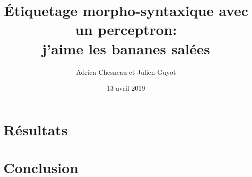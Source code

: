 \documentclass{article}
\title{Étiquetage morpho-syntaxique avec un perceptron: \\
  \large j'aime les bananes salées}
\date{13 avril 2019}
\author{Adrien Chesneau et Julien Guyot}
\begin{document}
\maketitle






\section{Résultats}








\section{Conclusion}
\end{document}
